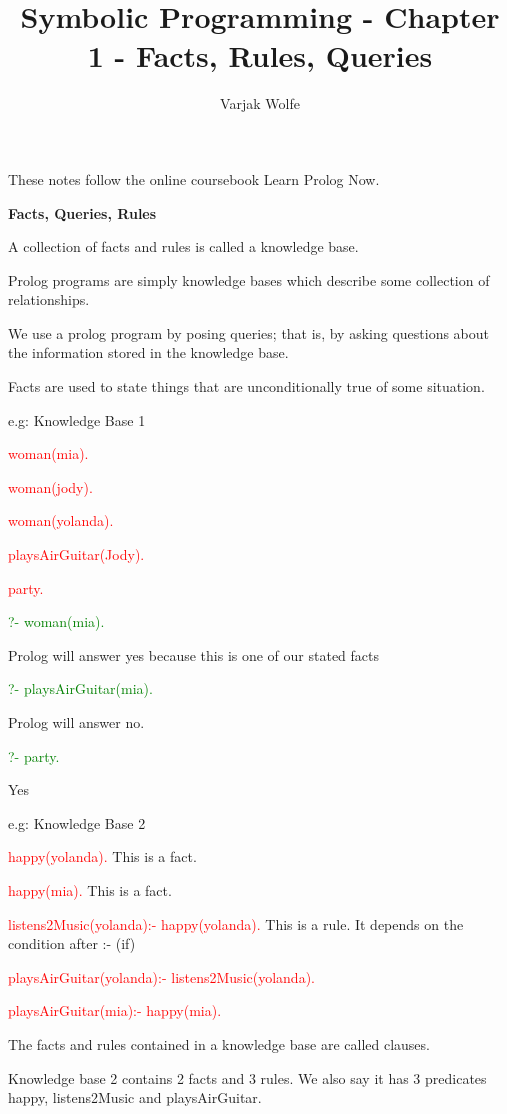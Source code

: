 \documentclass{article}
\title{Symbolic Programming -  Chapter 1 - Facts, Rules, Queries}
\author{Varjak Wolfe}
\begin{document}
\maketitle

These notes follow the online coursebook Learn Prolog Now.

\textbf{Facts, Queries, Rules}

A collection of facts and rules is called a knowledge base.

Prolog programs are simply knowledge bases which describe some collection of relationships.

We use a prolog program by posing queries; that is, by asking questions about the information stored in the knowledge base.

Facts are used to state things that are unconditionally true of some situation.

e.g: Knowledge Base 1

\textcolor{red}{woman(mia).}

\textcolor{red}{woman(jody).}

\textcolor{red}{woman(yolanda).}

\textcolor{red}{playsAirGuitar(Jody).}

\textcolor{red}{party.}

\textcolor{green}{?- woman(mia).}

Prolog will answer yes because this is one of our stated facts

\textcolor{green}{?- playsAirGuitar(mia).}

Prolog will answer no.

\textcolor{green}{?- party.}

Yes


e.g: Knowledge Base 2

\textcolor{red}{happy(yolanda).}  This is a fact.

\textcolor{red}{happy(mia).}  This is a fact.

\textcolor{red}{listens2Music(yolanda):- happy(yolanda).}   This is a rule. It depends on the condition after :- (if)

\textcolor{red}{playsAirGuitar(yolanda):- listens2Music(yolanda).}

\textcolor{red}{playsAirGuitar(mia):- happy(mia).}


The facts and rules contained in a knowledge base are called clauses. 

Knowledge base 2 contains 2 facts and 3 rules. We also say it has 3 predicates happy, listens2Music and playsAirGuitar.
\end{document}
